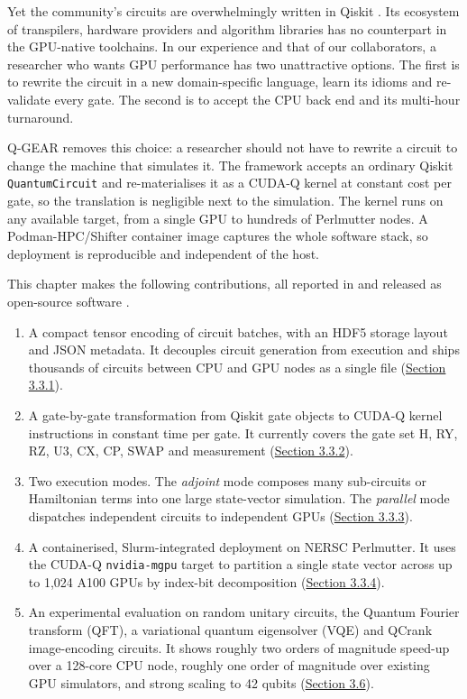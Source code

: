 \documentclass{report}
\theoremstyle{plain}
\theoremstyle{definition}
\theoremstyle{remark}
\begin{document}
Yet the community's circuits are overwhelmingly written in Qiskit \cite{javadiabhari2024qiskit}. Its ecosystem of transpilers, hardware providers and algorithm libraries has no counterpart in the GPU-native toolchains. In our experience and that of our collaborators, a researcher who wants GPU performance has two unattractive options. The first is to rewrite the circuit in a new domain-specific language, learn its idioms and re-validate every gate. The second is to accept the CPU back end and its multi-hour turnaround.

Q-GEAR removes this choice: a researcher should not have to rewrite a circuit to change the machine that simulates it. The framework accepts an ordinary Qiskit \texttt{QuantumCircuit} and re-materialises it as a CUDA-Q kernel at constant cost per gate, so the translation is negligible next to the simulation. The kernel runs on any available target, from a single GPU to hundreds of Perlmutter nodes. A Podman-HPC/Shifter container image captures the whole software stack, so deployment is reproducible and independent of the host.

This chapter makes the following contributions, all reported in \cite{guo2025qgear} and released as open-source software \cite{guo2025qgearsoftware}.
\begin{enumerate}
  \item A compact tensor encoding of circuit batches, with an HDF5 storage layout and JSON metadata. It decouples circuit generation from execution and ships thousands of circuits between CPU and GPU nodes as a single file (\hyperref[sec:qgear:encoding]{Section 3.3.1}).
  \item A gate-by-gate transformation from Qiskit gate objects to CUDA-Q kernel instructions in constant time per gate. It currently covers the gate set H, RY, RZ, U3, CX, CP, SWAP and measurement (\hyperref[sec:qgear:kernel]{Section 3.3.2}).
  \item Two execution modes. The \emph{adjoint} mode composes many sub-circuits or Hamiltonian terms into one large state-vector simulation. The \emph{parallel} mode dispatches independent circuits to independent GPUs (\hyperref[sec:qgear:modes]{Section 3.3.3}).
  \item A containerised, Slurm-integrated deployment on NERSC Perlmutter. It uses the CUDA-Q \texttt{nvidia-mgpu} target to partition a single state vector across up to 1,024 A100 GPUs by index-bit decomposition (\hyperref[sec:qgear:deploy]{Section 3.3.4}).
  \item An experimental evaluation on random unitary circuits, the Quantum Fourier transform (QFT), a variational quantum eigensolver (VQE) and QCrank image-encoding circuits. It shows roughly two orders of magnitude speed-up over a 128-core CPU node, roughly one order of magnitude over existing GPU simulators, and strong scaling to 42 qubits (\hyperref[sec:qgear:results]{Section 3.6}).
\end{enumerate}
\end{document}
